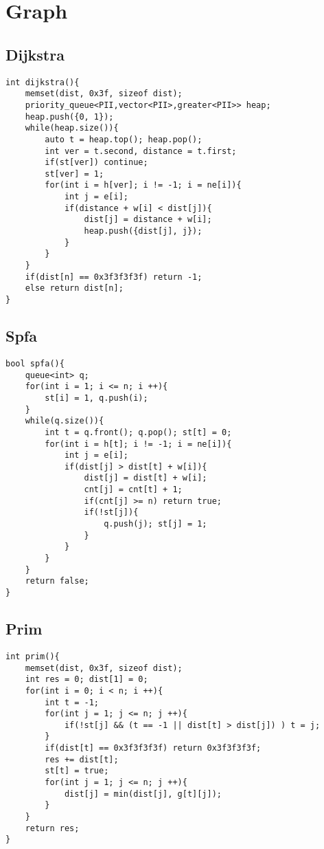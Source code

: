 \documentclass[twocolumn,a4]{article}
\begin{document}
\section{Graph}

\subsection{Dijkstra}
\begin{lstlisting}
int dijkstra(){
    memset(dist, 0x3f, sizeof dist);
    priority_queue<PII,vector<PII>,greater<PII>> heap;
    heap.push({0, 1});
    while(heap.size()){
        auto t = heap.top(); heap.pop();
        int ver = t.second, distance = t.first;
        if(st[ver]) continue;
        st[ver] = 1;
        for(int i = h[ver]; i != -1; i = ne[i]){
            int j = e[i];
            if(distance + w[i] < dist[j]){
                dist[j] = distance + w[i];
                heap.push({dist[j], j});
            }
        }
    }
    if(dist[n] == 0x3f3f3f3f) return -1;
    else return dist[n];
}

\end{lstlisting}
\subsection{Spfa}
\begin{lstlisting}
bool spfa(){
    queue<int> q;
    for(int i = 1; i <= n; i ++){
        st[i] = 1, q.push(i);
    }        
    while(q.size()){
        int t = q.front(); q.pop(); st[t] = 0;
        for(int i = h[t]; i != -1; i = ne[i]){
            int j = e[i];
            if(dist[j] > dist[t] + w[i]){
                dist[j] = dist[t] + w[i];
                cnt[j] = cnt[t] + 1;
                if(cnt[j] >= n) return true;
                if(!st[j]){
                    q.push(j); st[j] = 1;
                }
            }
        }
    }
    return false;
}
\end{lstlisting}
\subsection{Prim}

\begin{lstlisting}
int prim(){
    memset(dist, 0x3f, sizeof dist);    
    int res = 0; dist[1] = 0;
    for(int i = 0; i < n; i ++){
        int t = -1;
        for(int j = 1; j <= n; j ++){
            if(!st[j] && (t == -1 || dist[t] > dist[j]) ) t = j;
        }
        if(dist[t] == 0x3f3f3f3f) return 0x3f3f3f3f;
        res += dist[t];
        st[t] = true;
        for(int j = 1; j <= n; j ++){
            dist[j] = min(dist[j], g[t][j]);
        }
    }
    return res;
}
\end{lstlisting}
\end{document}
